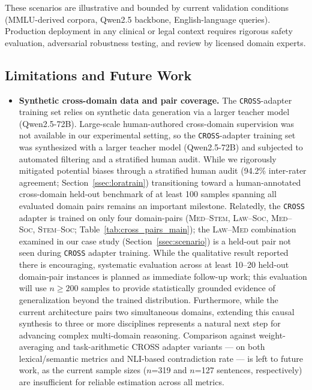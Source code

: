 \documentclass[a4paper,fleql,doubleblind]{cas-sc}
\begin{document}
These scenarios are illustrative and bounded by current validation conditions
(MMLU-derived corpora, Qwen2.5 backbone, English-language queries).
Production deployment in any clinical or legal context requires rigorous safety
evaluation, adversarial robustness testing, and review by licensed domain experts.

\subsection{Limitations and Future Work}
\label{sec:limitations}
\begin{itemize}
\item \textbf{Synthetic cross-domain data and pair coverage.}
The \texttt{CROSS}-adapter training set relies on synthetic data generation via a
larger teacher model (Qwen2.5-72B). Large-scale human-authored cross-domain supervision was not available in our experimental setting, so the \texttt{CROSS}-adapter training set was synthesized with a larger teacher model (Qwen2.5-72B) and subjected to automated filtering and a stratified human audit. While we rigorously mitigated potential biases through
a stratified human audit (94.2\% inter-rater agreement;
Section~\ref{ssec:loratrain}) transitioning toward a human-annotated cross-domain held-out benchmark
of at least 100 samples spanning all evaluated domain pairs remains an
important milestone. Relatedly, the \texttt{CROSS} adapter is trained on only four
domain-pairs (\textsc{Med}--\textsc{Stem}, \textsc{Law}--\textsc{Soc},
\textsc{Med}--\textsc{Soc}, \textsc{Stem}--\textsc{Soc};
Table~\ref{tab:cross_pairs_main}); the \textsc{Law}--\textsc{Med} combination
examined in our case study (Section~\ref{ssec:scenario}) is a held-out pair
not seen during \texttt{CROSS} adapter training. While the qualitative result reported there is encouraging, systematic
evaluation across at least 10--20 held-out domain-pair instances is planned
as immediate follow-up work; this evaluation will use $n{\geq}200$ samples to provide statistically grounded
evidence of generalization beyond the trained distribution. Furthermore, while the current architecture pairs
two simultaneous domains, extending this causal synthesis to three or more
disciplines represents a natural next step for advancing complex
multi-domain reasoning.
Comparison against weight-averaging and task-arithmetic CROSS adapter variants --- on both lexical/semantic metrics and NLI-based contradiction rate --- is left to future work, as the current sample sizes ($n$=319 and $n$=127 sentences, respectively) are insufficient for reliable estimation across all metrics.

\end{itemize}
\end{document}
